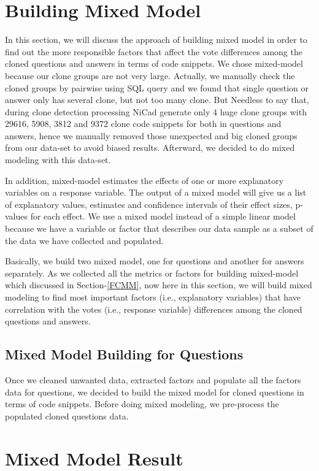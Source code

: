\documentclass[conference]{IEEEtran}
\begin{document}
\section{Building Mixed Model}
In this section, we will discuss the approach of building mixed model in order to find out the more responsible factors that affect the vote differences among the cloned questions and answers in terms of code snippets. We chose mixed-model because our clone groups are not very large. Actually, we manually check the cloned groups by pairwise using SQL query and we found that single question or answer only has several clone, but not too many clone. But Needless to say that, during clone detection processing NiCad generate only 4 huge clone groups with 29616, 5908, 3812 and 9372 clone code snippets for both in questions and answers, hence  we manually removed those unexpected and big cloned groups from our data-set to avoid biased results. Afterward, we decided to do mixed modeling with this data-set.


In addition,  mixed-model estimates the effects of one or more explanatory variables on a response variable. The output of a mixed model will give us a list of explanatory values, estimates and confidence intervals of their effect sizes, p-values for each effect. We use a mixed model instead of a simple linear model because we have a variable or factor that describes our data sample as a subset of the data we have collected and populated.  

Basically, we build two mixed model, one for questions and another for answers separately. As we collected all the metrics or factors for building mixed-model which discussed in Section-\ref{FCMM}, now here in this section, we will build mixed modeling to find most important factors (i.e., explanatory variables) that have correlation with the votes (i.e., response variable) differences among the cloned questions and answers.  

\subsection{Mixed Model Building for Questions}
Once we cleaned unwanted data, extracted factors and populate all the factors data for questions, we decided to build the mixed model for cloned questions in terms of code snippets. Before doing mixed modeling, we pre-process the populated cloned questions data.   
    

\section{Mixed Model Result}
	
\end{document}
